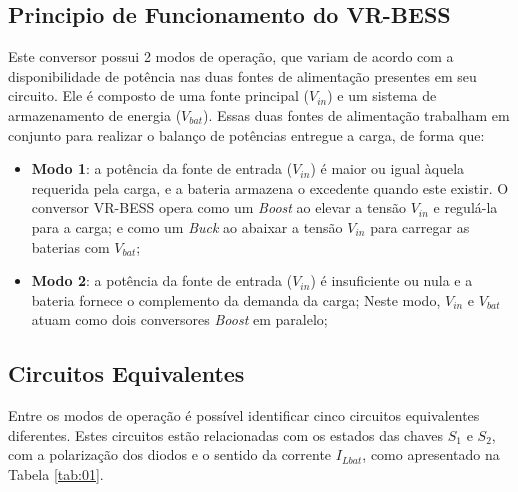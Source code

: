 \subsection{Principio de Funcionamento do VR-BESS}

Este conversor possui 2 modos de operação, que variam de acordo com a disponibilidade de potência nas duas fontes de alimentação presentes em seu circuito. Ele é composto de uma fonte principal ($V_{in}$) e um sistema de armazenamento de energia ($V_{bat}$). Essas duas fontes de alimentação trabalham em conjunto para realizar o balanço de potências entregue a carga, de forma que: 

\begin{itemize}
    \item \textbf{Modo 1}: a potência da fonte de entrada ($V_{in}$) é maior ou igual àquela requerida pela carga, e a bateria armazena o excedente quando este existir. O conversor VR-BESS opera como um \textit{Boost} ao elevar a tensão $V_{in}$ e regulá-la para a carga; e como um \textit{Buck} ao abaixar a tensão $V_{in}$ para carregar as baterias com $V_{bat}$;
    \item \textbf{Modo 2}: a potência da fonte de entrada ($V_{in}$) é insuficiente ou nula e a bateria fornece o complemento da demanda da carga; Neste modo, $V_{in}$ e $V_{bat}$ atuam como dois conversores \textit{Boost} em paralelo;
\end{itemize}


\subsection{Circuitos Equivalentes}

Entre os modos de operação é possível identificar cinco circuitos equivalentes diferentes. Estes circuitos estão relacionadas com os estados das chaves $S_1$ e $S_2$, com a polarização dos diodos e o sentido da corrente $I_{Lbat}$, como apresentado na Tabela \ref{tab:01}. 

